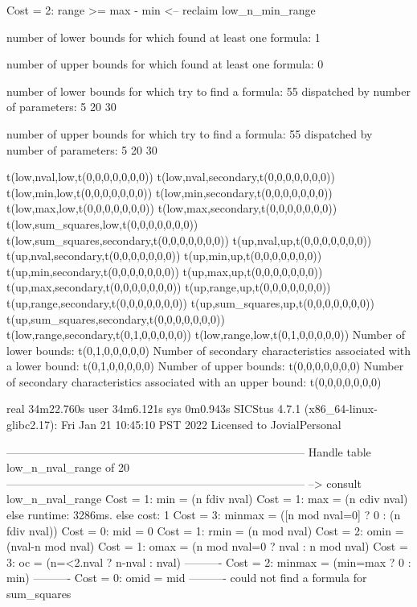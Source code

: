 Cost =  2:  range >= max - min
<-- reclaim low_n_min_range

number of lower bounds for which found at least one formula: 1

number of upper bounds for which found at least one formula: 0

number of lower bounds for which try to find a formula: 55
dispatched by number of parameters: 5  20  30

number of upper bounds for which try to find a formula: 55
dispatched by number of parameters: 5  20  30

t(low,nval,low,t(0,0,0,0,0,0,0))
t(low,nval,secondary,t(0,0,0,0,0,0,0))
t(low,min,low,t(0,0,0,0,0,0,0))
t(low,min,secondary,t(0,0,0,0,0,0,0))
t(low,max,low,t(0,0,0,0,0,0,0))
t(low,max,secondary,t(0,0,0,0,0,0,0))
t(low,sum_squares,low,t(0,0,0,0,0,0,0))
t(low,sum_squares,secondary,t(0,0,0,0,0,0,0))
t(up,nval,up,t(0,0,0,0,0,0,0))
t(up,nval,secondary,t(0,0,0,0,0,0,0))
t(up,min,up,t(0,0,0,0,0,0,0))
t(up,min,secondary,t(0,0,0,0,0,0,0))
t(up,max,up,t(0,0,0,0,0,0,0))
t(up,max,secondary,t(0,0,0,0,0,0,0))
t(up,range,up,t(0,0,0,0,0,0,0))
t(up,range,secondary,t(0,0,0,0,0,0,0))
t(up,sum_squares,up,t(0,0,0,0,0,0,0))
t(up,sum_squares,secondary,t(0,0,0,0,0,0,0))
t(low,range,secondary,t(0,1,0,0,0,0,0))
t(low,range,low,t(0,1,0,0,0,0,0))
Number of lower bounds:                                             t(0,1,0,0,0,0,0)
Number of secondary characteristics associated with a lower bound:  t(0,1,0,0,0,0,0)
Number of upper bounds:                                             t(0,0,0,0,0,0,0)
Number of secondary characteristics associated with an upper bound: t(0,0,0,0,0,0,0)

real	34m22.760s
user	34m6.121s
sys	0m0.943s
SICStus 4.7.1 (x86_64-linux-glibc2.17): Fri Jan 21 10:45:10 PST 2022
Licensed to JovialPersonal


--------------------------------------------------------------------------------
Handle table low_n_nval_range of 20
--------------------------------------------------------------------------------
--> consult low_n_nval_range
Cost =  1:  min         = (n fdiv nval)
Cost =  1:  max         = (n cdiv nval)
else runtime: 3286ms. else cost: 1
Cost =  3:  minmax      = ([n mod nval=0] ? 0 : (n fdiv nval)) %
Cost =  0:  mid         = 0
Cost =  1:  rmin        = (n mod nval)
Cost =  2:  omin        = (nval-n mod nval)
Cost =  1:  omax        = (n mod nval=0 ? nval : n mod nval)
Cost =  3:  oc          = (n=<2.nval ? n-nval : nval)
----------
Cost =  2:  minmax      = (min=max ? 0 : min)
----------
Cost =  0:  omid        = mid
----------
could not find a formula for sum_squares

